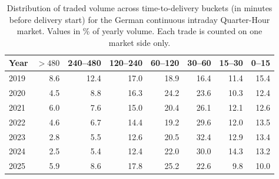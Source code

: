 \begin{table}[ht]
\centering
\caption{Distribution of traded volume across time-to-delivery buckets (in minutes before delivery start) for the German continuous intraday Quarter-Hour market. Values in \% of yearly volume. Each trade is counted on one market side only.}
\label{tab:intraday_time_to_delivery}
\small
\begin{tabular}{lrrrrrrr}
\toprule
Year & $>480$ & 240--480 & 120--240 & 60--120 & 30--60 & 15--30 & 0--15 \\
\midrule
2019 & 8.6 & 12.4 & 17.0 & 18.9 & 16.4 & 11.4 & 15.4 \\
2020 & 4.5 & 8.8 & 16.3 & 24.2 & 23.6 & 10.3 & 12.4 \\
2021 & 6.0 & 7.6 & 15.0 & 20.4 & 26.1 & 12.1 & 12.6 \\
2022 & 4.6 & 6.7 & 14.4 & 19.2 & 29.6 & 12.0 & 13.5 \\
2023 & 2.8 & 5.5 & 12.6 & 20.5 & 32.4 & 12.9 & 13.4 \\
2024 & 2.5 & 5.4 & 12.4 & 22.0 & 30.0 & 14.3 & 13.2 \\
2025 & 5.9 & 8.6 & 17.8 & 25.2 & 22.6 & 9.8 & 10.0 \\
\bottomrule
\end{tabular}
\end{table}
